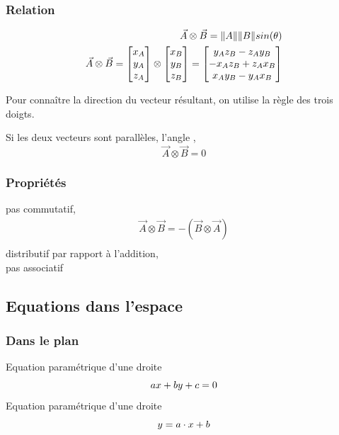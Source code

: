 \documentclass[12pt,a4paper,twoside]{article}
\numberwithin{equation}{subsection}
\DeclarePairedDelimiter{\norm}{\lVert}{\rVert}
\begin{document}
\subsubsection{Relation}
\begin{eqnarray}
\vec{A} \otimes \vec{B}=\norm{A} \norm{B} sin(\theta)\\
\vec{A} \otimes \vec{B}=
\begin{bmatrix}
x_A \\
y_A\\
z_A
\end{bmatrix}
\otimes
\begin{bmatrix}
x_B \\
y_B\\
z_B
\end{bmatrix}= 
\begin{bmatrix}
y_A z_B - z_A y_B \\
-x_A z_B + z_A x_B\\
x_A y_B - y_A x_B
\end{bmatrix}
\end{eqnarray}

Pour connaître la direction du vecteur résultant, on utilise la règle des trois doigts. 

Si les deux vecteurs sont parallèles, l'angle , 
\begin{equation}
\vec{A} \otimes \vec{B}=0
\end{equation}


\subsubsection{Propriétés}
pas commutatif,
\begin{eqnarray}
\vec{A} \otimes \vec{B}=-(\vec{B} \otimes \vec{A})\\
\end{eqnarray}
 distributif par rapport à l'addition, \\
 
 pas associatif

\subsection{Equations dans l'espace}
\subsubsection{Dans le plan}
Equation paramétrique d'une droite\\
\begin{equation}
ax+by+c=0\\
\end{equation}
Equation paramétrique d'une droite\\
\begin{equation}
y=a\cdot x+b\\
\end{equation}
\end{document}
